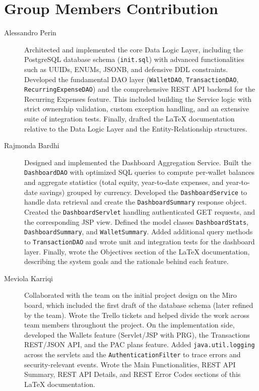 \section{Group Members Contribution}


\begin{description}
	\item[Alessandro Perin] Architected and implemented the core Data Logic Layer, including the PostgreSQL database schema (\texttt{init.sql}) with advanced functionalities such as UUIDs, ENUMs, JSONB, and defensive DDL constraints. Developed the fundamental DAO layer (\texttt{WalletDAO}, \texttt{TransactionDAO}, \texttt{RecurringExpenseDAO}) and the comprehensive REST API backend for the Recurring Expenses feature. This included building the Service logic with strict ownership validation, custom exception handling, and an extensive suite of integration tests. Finally, drafted the LaTeX documentation relative to the Data Logic Layer and the Entity-Relationship structures.
	\item[Rajmonda Bardhi] Designed and implemented the Dashboard Aggregation Service. Built the \texttt{DashboardDAO} with optimized SQL queries to compute per-wallet balances and aggregate statistics (total equity, year-to-date expenses, and year-to-date savings) grouped by currency. Developed the \texttt{DashboardService} to handle data retrieval and create the \texttt{DashboardSummary} response object. Created the \texttt{DashboardServlet} handling authenticated GET requests, and the corresponding JSP view. Defined the model classes \texttt{DashboardStats}, \texttt{DashboardSummary}, and \texttt{WalletSummary}. Added additional query methods to \texttt{TransactionDAO} and wrote unit and integration tests for the dashboard layer. Finally, wrote the Objectives section of the LaTeX documentation, describing the system goals and the rationale behind each feature.
	\item[Meviola Karriqi] Collaborated with the team on the initial project design on the Miro board, which included the first draft of the database schema (later refined by the team). Wrote the Trello tickets and helped divide the work across team members throughout the project. On the implementation side, developed the Wallets feature (Servlet/JSP with PRG), the Transactions REST/JSON API, and the PAC plans feature. Added \texttt{java.util.logging} across the servlets and the \texttt{AuthenticationFilter} to trace errors and security-relevant events. Wrote the Main Functionalities, REST API Summary, REST API Details, and REST Error Codes sections of this LaTeX documentation.

\end{description}
